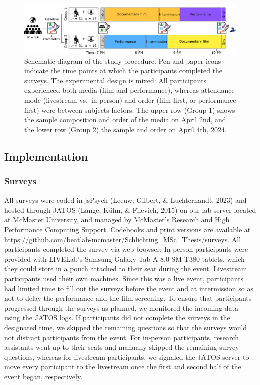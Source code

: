\documentclass[
  man,floatsintext]{apa6}
\begin{document}
\begin{figure}
\includegraphics[width=1\linewidth]{images/Innocents_Diagram_StudyDesign} \caption{Schematic diagram of the study procedure. Pen and paper icons indicate the time points at which the participants completed the surveys. The experimental design is mixed: All participants experienced both media (film and performance), whereas attendance mode (livestream vs.~in-person) and order (film first, or performance first) were between-subjects factors. The upper row (Group 1) shows the sample composition and order of the media on April 2nd, and the lower row (Group 2) the sample and order on April 4th, 2024.}\label{fig:study-design}
\end{figure}

\subsection{Implementation}\label{implementation}

\subsubsection{Surveys}\label{surveys}

All surveys were coded in jsPsych (Leeuw, Gilbert, \& Luchterhandt, 2023) and hosted through JATOS (Lange, Kühn, \& Filevich, 2015) on our lab server located at McMaster University, and managed by McMaster's Research and High Performance Computing Support. Codebooks and print versions are available at \url{https://github.com/beatlab-mcmaster/Schlichting_MSc_Thesis/surveys}. All participants completed the survey via web browser: In-person participants were provided with LIVELab's Samsung Galaxy Tab A 8.0 SM-T380 tablets, which they could store in a pouch attached to their seat during the event. Livestream participants used their own machines. Since this was a live event, participants had limited time to fill out the surveys before the event and at intermission so as not to delay the performance and the film screening. To ensure that participants progressed through the surveys as planned, we monitored the incoming data using the JATOS logs. If participants did not complete the surveys in the designated time, we skipped the remaining questions so that the surveys would not distract participants from the event. For in-person participants, research assistants went up to their seats and manually skipped the remaining survey questions, whereas for livestream participants, we signaled the JATOS server to move every participant to the livestream once the first and second half of the event began, respectively.
\end{document}
